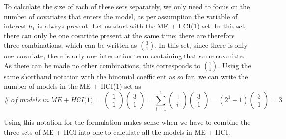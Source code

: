 To calculate the size of each of these sets separately, we only need to focus on the number of covariates that enters the model, as per assumption the variable of interest $h_1$ is always present. Let us start with the ME + HCI(1) set. In this set, there can only be one covariate present at the same time; there are therefore three combinations, which can be written as $\binom{3}{1}$. In this set, since there is only one covariate, there is only one interaction term containing that same covariate. As there can be made no other combinations, this corresponds to $\binom{1}{1}$. Using the same shorthand notation with the binomial coefficient as so far, we can write the number of models in the ME + HCI(1) set as
\[\#\ of\ models\ in\ ME + HCI\textit{(1)}\ =\left( \begin{array}{c}
1 \\ 
1 \end{array}
\right)\left( \begin{array}{c}
3 \\ 
1 \end{array}
\right)=\sum^1_{i=1}{\left( \begin{array}{c}
1 \\ 
i \end{array}
\right)}\left( \begin{array}{c}
3 \\ 
1 \end{array}
\right)=\left(2^1-1\right)\left( \begin{array}{c}
3 \\ 
1 \end{array}
\right)=3\] 

Using this notation for the formulation makes sense when we have to combine the three sets of ME + HCI into one to calculate all the models in ME + HCI.

